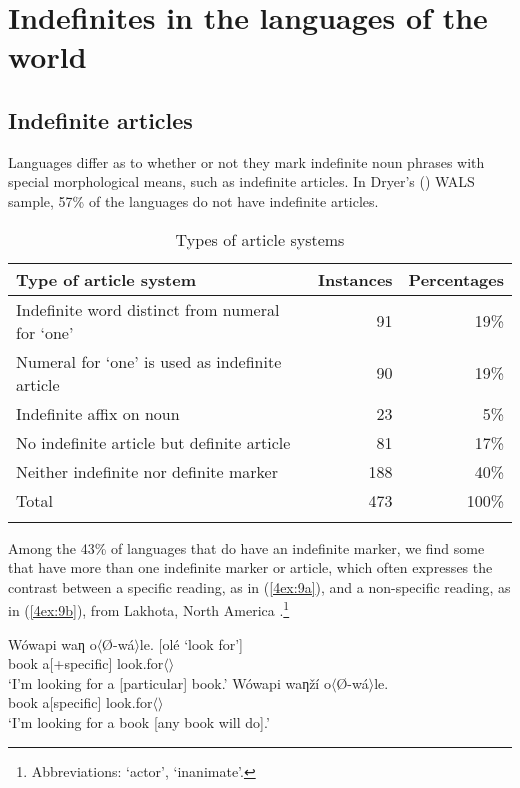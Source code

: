 \documentclass[output=paper]{langsci/langscibook}
\begin{document}
\section{Indefinites in the languages of the world}\label{4sec:2}

\subsection{Indefinite articles}\label{4sec:21}

Languages differ as to whether or not they mark indefinite noun phrases with special morphological means, such as indefinite articles. In Dryer's (\citeyear{dryer:05}) WALS sample, 57\% of the languages do not have indefinite articles.

\begin{table}[H]
\centering
\begin{tabular}{lrr}
\lsptoprule
Type of article system & Instances & Percentages \\
\midrule
Indefinite word distinct from numeral for `one' & 91 & 19\% \\
Numeral for `one' is used as indefinite article & 90 & 19\% \\
Indefinite affix on noun & 23 & 5\% \\
No indefinite article but definite article & 81 & 17\% \\
Neither indefinite nor definite marker & 188 & 40\% \\
Total & 473 & 100\% \\
\lspbottomrule
\end{tabular}
\caption{Types of article systems \citep{dryer:05} }\label{4table:1}
\end{table}

\filbreak
Among the 43\% of languages that do have an indefinite marker, we find some that have more than one indefinite marker or article, which often expresses the contrast between a specific reading, as in (\ref{4ex:9a}), and a non-specific reading, as in (\ref{4ex:9b}), from Lakhota, North America \citep[][405]{latrouite:vanvalin:14}.\footnote{Abbreviations: {} `actor', {} `inanimate'. }

\begin{exe}
\ex\label{4ex:9}
	\begin{xlista}
	\ex\label{4ex:9a}
	\gll	Wówapi	waƞ			o$\langle$Ø-wá$\rangle$le.			\hspace*{1cm}[olé `look for'] \\
		book		a[+specific]	look.for$\langle${}$\rangle$ \\
	\glt	`I'm looking for a [particular] book.'
	\ex\label{4ex:9b}
	\gll	Wówapi waƞží             o$\langle$Ø-wá$\rangle$le. \\
		book       a[\minus specific]   look.for$\langle${}$\rangle$ \\
	\glt	`I'm looking for a book [any book will do].'
	\end{xlista}
\end{exe}
\end{document}
